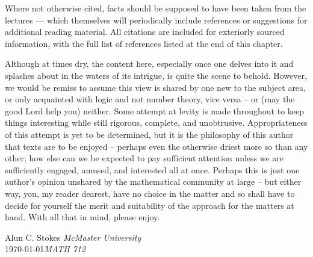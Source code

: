 Where not otherwise cited, facts should be supposed to have been taken from the lectures — which themselves will periodically include references or suggestions for additional reading material. All citations are included for exteriorly sourced information, with the full list of references listed at the end of this chapter. 

Although at times dry, the content here, especially once one delves into it and splashes about in the waters of its intrigue, is quite the scene to behold. However, we would be remiss to assume this view is shared by one new to the subject area, or only acquainted with logic and not number theory, vice versa -- or (may the good Lord help you) neither. Some attempt at levity is made throughout to keep things interesting while still rigorous, complete, and unobtrusive. Appropriateness of this attempt is yet to be determined, but it is the philosophy of this author that texts are to be enjoyed -- perhaps even the otherwise driest more so than any other; how else can we be expected to pay sufficient attention unless we are sufficiently engaged, amused, and interested all at once. Perhaps this is just one author's opinion unshared by the mathematical community at large -- but either way, you, my reader dearest, have no choice in the matter and so shall have to decide for yourself the merit and suitability of the approach for the matters at hand. With all that in mind, please enjoy.


\vspace{\baselineskip}
\begin{flushright}\noindent
Alun C. Stokes \hfill {\it McMaster University}\\
\monthyeardate\today \hfill {\it MATH 712}\\
\end{flushright}


